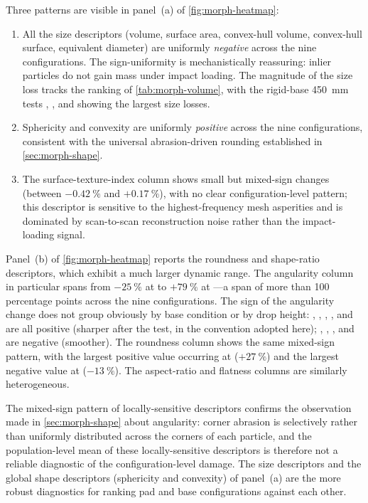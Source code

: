 Three patterns are visible in panel~(a) of \cref{fig:morph-heatmap}:
\begin{enumerate}[label=(\arabic*),leftmargin=*]
    \item All the size descriptors (volume, surface area, convex-hull
          volume, convex-hull surface, equivalent diameter) are uniformly
          \emph{negative} across the nine configurations. The
          sign-uniformity is mechanistically reassuring: inlier particles
          do not gain mass under impact loading. The magnitude of the size
          loss tracks the ranking of \cref{tab:morph-volume}, with the
          rigid-base \SI{450}{\milli\metre} tests ,
          , and  showing the largest size
          losses.
    \item Sphericity and convexity are uniformly \emph{positive} across the
          nine configurations, consistent with the universal
          abrasion-driven rounding established in \cref{sec:morph-shape}.
    \item The surface-texture-index column shows small but mixed-sign
          changes (between $-\SI{0.42}{\percent}$ and
          $+\SI{0.17}{\percent}$), with no clear configuration-level
          pattern; this descriptor is sensitive to the highest-frequency
          mesh asperities and is dominated by scan-to-scan reconstruction
          noise rather than the impact-loading signal.
\end{enumerate}

Panel~(b) of \cref{fig:morph-heatmap} reports the roundness and shape-ratio
descriptors, which exhibit a much larger dynamic range. The angularity
column in particular spans from $-\SI{25}{\percent}$ at  to
$+\SI{79}{\percent}$ at ---a span of more than 100
percentage points across the nine configurations. The sign of the
angularity change does not group obviously by base condition or by drop
height: , , , ,
and  are all positive (sharper after the test, in the
convention adopted here); , , ,
and  are negative (smoother). The roundness column shows the
same mixed-sign pattern, with the largest positive value occurring at
 ($+\SI{27}{\percent}$) and the largest negative value at
 ($-\SI{13}{\percent}$). The aspect-ratio and flatness
columns are similarly heterogeneous.

\begin{finding}[title=Choose the descriptor to match the question]
The mixed-sign pattern of locally-sensitive descriptors confirms the
observation made in \cref{sec:morph-shape} about angularity: corner
abrasion is selectively rather than uniformly distributed across the
corners of each particle, and the population-level mean of these
locally-sensitive descriptors is therefore not a reliable diagnostic of
the configuration-level damage. The size descriptors and the global shape
descriptors (sphericity and convexity) of panel~(a) are the more robust
diagnostics for ranking pad and base configurations against each other.
\end{finding}

